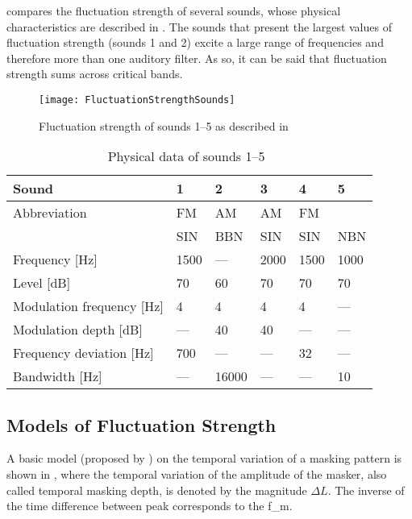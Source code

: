 \documentclass[../main.tex]{subfiles}
\begin{document}
\begin{theoreticalbackground}
 compares the fluctuation strength of several sounds,
whose physical characteristics are described in . The
sounds that present the largest values of fluctuation strength (sounds 1 and 2)
excite a large range of frequencies and therefore more than one auditory filter.
As so, it can be said that fluctuation strength sums across critical bands.

\begin{figure}[!ht]
  \centering
  \texttt{[image: FluctuationStrengthSounds]}
  \caption{Fluctuation strength of sounds 1--5 as described in
    ~\cite[pp. 252]{Fastl2007Psychoacoustics}}
\label{fig:flucstrensnds}
\end{figure}

\begin{table}[!ht]
  \centering
  \begin{tabu} to \linewidth{ lXXXXX }
    \toprule
    Sound & 1 & 2 & 3 & 4 & 5 \\
    \midrule
    Abbreviation & FM & AM & AM & FM & \\
    & SIN & BBN & SIN & SIN & NBN \\
    Frequency [Hz] & 1500 & --- & 2000 & 1500 & 1000 \\
    Level [dB] & 70 & 60 & 70 & 70 & 70 \\
    Modulation frequency [Hz] & 4 & 4 & 4 & 4 & --- \\
    Modulation depth [dB] & --- & 40 & 40 & --- & --- \\
    Frequency deviation [Hz] & 700 & --- & --- & 32 & --- \\
    Bandwidth [Hz] & --- & 16000 & --- & --- & 10 \\
    \bottomrule
  \end{tabu}
  \caption{Physical data of sounds
    1--5~\cite[pp. 253]{Fastl2007Psychoacoustics}}
\label{tab:flucstrensnds}
\end{table}

\subsection{Models of Fluctuation Strength}

A basic model (proposed by \textcite[pp.~254]{Fastl2007Psychoacoustics}) on the
temporal variation of a masking pattern is shown in ,
where the temporal variation of the amplitude of the masker, also called
temporal masking depth, is denoted by the magnitude $\Delta L$. The inverse of
the time difference between peak corresponds to the \gls{f_m}.


\end{theoreticalbackground}
\end{document}
